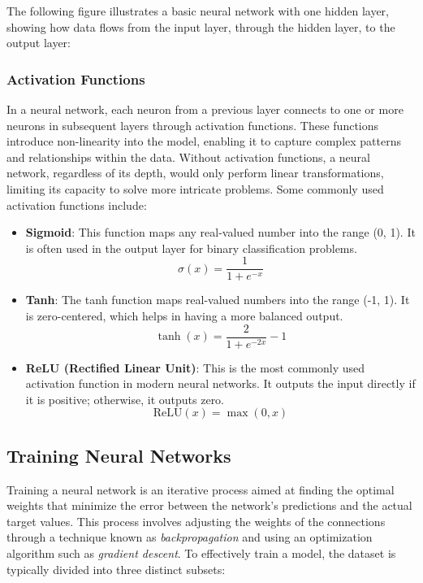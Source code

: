 \documentclass[../Thesis.tex]{subfiles}
\begin{document}
	The following figure illustrates a basic neural network with one hidden layer, showing how data flows from the input layer, through the hidden layer, to the output layer:
	
	
	\subsubsection{Activation Functions}
	
	In a neural network, each neuron from a previous layer connects to one or more neurons in subsequent layers through activation functions. These functions introduce non-linearity into the model, enabling it to capture complex patterns and relationships within the data. Without activation functions, a neural network, regardless of its depth, would only perform linear transformations, limiting its capacity to solve more intricate problems. Some commonly used activation functions include:
	
	\begin{itemize}
		\item \textbf{Sigmoid}: This function maps any real-valued number into the range (0, 1). It is often used in the output layer for binary classification problems.
		\[
		\sigma(x) = \frac{1}{1 + e^{-x}}
		\]
		\item \textbf{Tanh}: The tanh function maps real-valued numbers into the range (-1, 1). It is zero-centered, which helps in having a more balanced output.
		\[
		\tanh(x) = \frac{2}{1 + e^{-2x}} - 1
		\]
		\item \textbf{ReLU (Rectified Linear Unit)}: This is the most commonly used activation function in modern neural networks. It outputs the input directly if it is positive; otherwise, it outputs zero.
		\[
		\text{ReLU}(x) = \max(0, x)
		\]
	\end{itemize}
	
\subsection{Training Neural Networks}

Training a neural network is an iterative process aimed at finding the optimal weights that minimize the error between the network's predictions and the actual target values. This process involves adjusting the weights of the connections through a technique known as \emph{backpropagation} and using an optimization algorithm such as \emph{gradient descent}. To effectively train a model, the dataset is typically divided into three distinct subsets:
\end{document}
